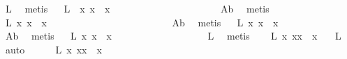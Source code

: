 \begin{isabellebody}
\ L{}\ \isamarkupfalse%
\ metis\isanewline
\ \isamarkupfalse%
\ L{}{\isacharcolon}\ \ {\isachardoublequoteopen}{\isasymforall}x{\isachardot}\ {\isasymbox}{\isasymbox}{\isacharparenleft}x{\isasymbox}{\isacharparenright}\ {\isasymapprox}\ {\isasymbox}x{\isachardoublequoteclose}\ \ \ \ \ \ \ \ \ \ \ \ \ \ \ \ \ \ \ \ \ \isamarkupfalse%
\ A{}b\ \isamarkupfalse%
\ metis\isanewline
\ \isamarkupfalse%
\ L{}{}{\isacharcolon}\ {\isachardoublequoteopen}{\isasymforall}x{\isachardot}\ {\isasymbox}{\isasymbox}x\ {\isasymapprox}\ {\isasymbox}x{\isachardoublequoteclose}\ \ \ \ \ \ \ \ \ \ \ \ \ \ \ \ \ \ \ \ \ \ \ \ \isamarkupfalse%
\ A{}b\ \isamarkupfalse%
\ metis\isanewline
\ \isamarkupfalse%
\ L{}{}{\isacharcolon}\ {\isachardoublequoteopen}{\isasymforall}x{\isachardot}\ {\isasymbox}{\isasymbox}{\isacharparenleft}{\isacharparenleft}{\isasymbox}x{\isacharparenright}{\isasymbox}{\isacharparenright}\ {\isasymapprox}\ {\isasymbox}{\isasymbox}{\isacharparenleft}x{\isasymbox}{\isacharparenright}{\isachardoublequoteclose}\ \ \ \ \ \ \ \ \ \ \ \ \ \isamarkupfalse%
\ A{}b\ \isamarkupfalse%
\ metis\isanewline
\ \isamarkupfalse%
\ L{}{}{\isacharcolon}\ {\isachardoublequoteopen}{\isasymforall}x{\isachardot}\ {\isasymbox}{\isasymbox}{\isacharparenleft}{\isacharparenleft}{\isasymbox}x{\isacharparenright}{\isasymbox}{\isacharparenright}\ {\isasymapprox}\ {\isasymbox}x{\isachardoublequoteclose}\ \ \ \ \ \ \ \ \ \ \ \ \ \ \ \ \ \ \isamarkupfalse%
\ L{}\ \isamarkupfalse%
\ metis\isanewline
\ \isamarkupfalse%
\ \ L{}{}{\isacharcolon}\ {\isachardoublequoteopen}{\isasymforall}x{\isachardot}\ {\isacharparenleft}{\isasymbox}{\isasymbox}{\isacharparenleft}{\isacharparenleft}{\isasymbox}x{\isacharparenright}{\isasymbox}{\isacharparenright}{\isacharparenright}{\isasymcdot}{\isacharparenleft}{\isacharparenleft}{\isasymbox}x{\isacharparenright}{\isasymbox}{\isacharparenright}\ {\isasymapprox}\ {\isacharparenleft}{\isacharparenleft}{\isasymbox}x{\isacharparenright}{\isasymbox}{\isacharparenright}{\isachardoublequoteclose}\ \ \isamarkupfalse%
\ L{}\ \isamarkupfalse%
\ auto\ \ \ \isanewline
\ \isamarkupfalse%
\ L{}{}{\isacharcolon}\ {\isachardoublequoteopen}{\isasymforall}x{\isachardot}\ {\isacharparenleft}{\isasymbox}x{\isacharparenright}{\isasymcdot}{\isacharparenleft}{\isacharparenleft}{\isasymbox}x{\isacharparenright}{\isasymbox}{\isacharparenright}\ {\isasymapprox}\ {\isacharparenleft}{\isasymbox}x{\isacharparenright}{\isasymbox}{\isachardoublequoteclose}\ \ \ \ \ \ \ \ \ \ \ \ \isamarkupfalse%

\end{isabellebody}
